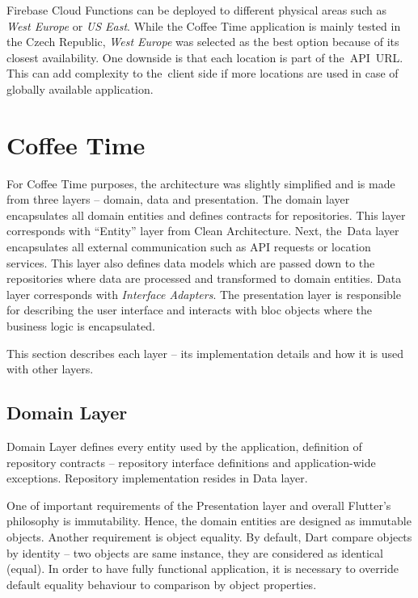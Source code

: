 Firebase Cloud Functions can be deployed to different physical areas such as \textit{West Europe} or \textit{US East}. While the Coffee Time application is mainly tested in the Czech Republic, \textit{West Europe} was selected as the best option because of its closest availability. One downside is that each location is part of the~API~URL. This can add complexity to the~client side if more locations are used in case of globally available application. 

\section{Coffee Time}
For Coffee Time purposes, the architecture was slightly simplified and is made from three layers -- domain, data and presentation. The domain layer encapsulates all domain entities and defines contracts for repositories. This layer corresponds with ``Entity'' layer from Clean Architecture. Next, the~Data layer encapsulates all external communication such as API requests or location services. This layer also defines data models which are passed down to the repositories where data are processed and transformed to domain entities. Data layer corresponds with \textit{Interface Adapters}. The presentation layer is responsible for describing the user interface and interacts with \gls{bloc} objects where the business logic is encapsulated.

This section describes each layer -- its implementation details and how it is used with other layers.  
\subsection{Domain Layer}
Domain Layer defines every entity used by the application, definition of repository contracts -- repository interface definitions and application-wide exceptions. Repository implementation resides in Data layer. 

One of important requirements of the Presentation layer and overall Flutter's philosophy is immutability. Hence, the domain entities are designed as immutable objects. Another requirement is object equality. By default, Dart compare objects by identity -- two objects are same instance, they are considered as identical (equal). In order to have fully functional application, it is necessary to override default equality behaviour to comparison by object properties. 

